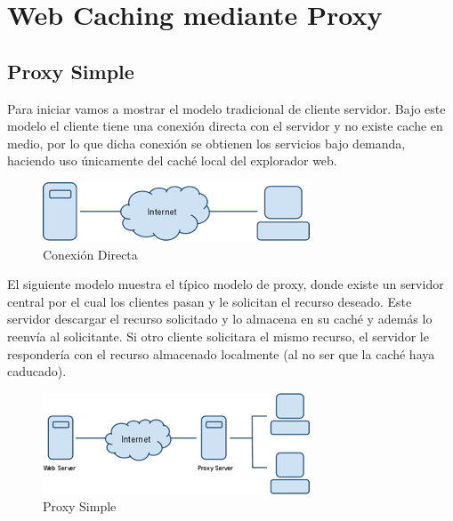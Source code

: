 
\section{Web Caching mediante Proxy}


\subsection{Proxy Simple}

Para iniciar vamos a mostrar el modelo tradicional de cliente servidor. Bajo este modelo el cliente tiene una conexión directa con el servidor y no existe cache en medio, por lo que dicha conexión se obtienen los servicios bajo demanda, haciendo uso únicamente del caché local del explorador web.

\begin{figure}[h]
  \centering
    \includegraphics[scale=1]{gfx/proxy_simple_1}
  \caption{Conexión Directa}
  \label{conexionhttp}
\end{figure}

El siguiente modelo muestra el típico modelo de proxy, donde existe un servidor central por el cual los clientes pasan y le solicitan el recurso deseado. Este servidor descargar el recurso solicitado y lo almacena en su caché y además lo reenvía al solicitante. Si otro cliente solicitara el mismo recurso, el servidor le respondería con el recurso almacenado localmente (al no ser que la caché haya caducado).

\begin{figure}[h]
  \centering
    \includegraphics[scale=1]{gfx/proxy_simple_2}
  \caption{Proxy Simple}
  \label{conexionhttp}
\end{figure}


